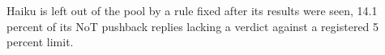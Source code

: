 Haiku is left out of the pool by a rule fixed after its results were seen, 14.1
percent of its NoT pushback replies lacking a verdict against a registered 5
percent limit.
